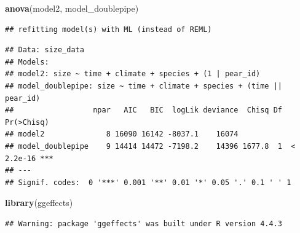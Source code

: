 \documentclass[
]{article}
\newenvironment{Shaded}{\begin{snugshade}}{\end{snugshade}}
\newcommand{\FunctionTok}[1]{\textcolor[rgb]{0.13,0.29,0.53}{\textbf{#1}}}
\newcommand{\NormalTok}[1]{#1}
\begin{document}
\begin{Shaded}
\begin{Highlighting}[]
\FunctionTok{anova}\NormalTok{(model2, model\_doublepipe)}
\end{Highlighting}
\end{Shaded}

\begin{verbatim}
## refitting model(s) with ML (instead of REML)
\end{verbatim}

\begin{verbatim}
## Data: size_data
## Models:
## model2: size ~ time + climate + species + (1 | pear_id)
## model_doublepipe: size ~ time + climate + species + (time || pear_id)
##                  npar   AIC   BIC  logLik deviance  Chisq Df Pr(>Chisq)    
## model2              8 16090 16142 -8037.1    16074                         
## model_doublepipe    9 14414 14472 -7198.2    14396 1677.8  1  < 2.2e-16 ***
## ---
## Signif. codes:  0 '***' 0.001 '**' 0.01 '*' 0.05 '.' 0.1 ' ' 1
\end{verbatim}

\begin{Shaded}
\begin{Highlighting}[]
\FunctionTok{library}\NormalTok{(ggeffects)}
\end{Highlighting}
\end{Shaded}

\begin{verbatim}
## Warning: package 'ggeffects' was built under R version 4.4.3
\end{verbatim}
\end{document}
